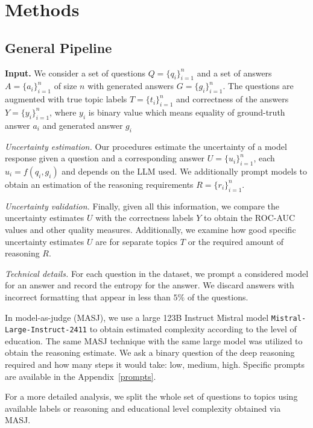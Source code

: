 \section{Methods}

\subsection{General Pipeline}

\textbf{Input.} We consider a set of questions $Q = \{q_i \}_{i = 1}^n$ and a set of answers $A = \{a_i \}_{i = 1}^n$ of size $n$ with generated answers $G = \{g_i \}_{i = 1}^n$.
The questions are augmented with true topic labels $T = \{t_i \}_{i = 1}^n$ and correctness of the answers $Y = \{y_i \}_{i = 1}^n$, where $y_i$ is binary value which means equality of ground-truth answer $a_i$ and generated answer $g_i$

\textit{Uncertainty estimation.} Our procedures estimate the uncertainty of a model response given a question and a corresponding answer $U = \{u_i \}_{i = 1}^n$, each $u_i = f(q_i, g_i)$ and depends on the LLM used.
We additionally prompt models to obtain an estimation of the reasoning requirements $R = \{r_i \}_{i = 1}^n$. 

\textit{Uncertainty validation.} Finally, given all this information, we compare the uncertainty estimates $U$ with the correctness labels $Y$ to obtain the ROC-AUC values and other quality measures. Additionally, we examine how good specific uncertainty estimates $U$ are for separate topics $T$ or the required amount of reasoning $R$.

\textit{Technical details.}
For each question in the dataset, we prompt a considered model for an answer and record the entropy for the answer. We discard answers with incorrect formatting that appear in less than $5\%$ of the questions.

In model-as-judge (MASJ), we use a large 123B Instruct Mistral model \texttt{Mistral-Large-Instruct-2411} to obtain estimated complexity according to the level of education.
The same MASJ technique with the same large model was utilized to obtain the reasoning estimate. We ask a binary question of the deep reasoning required and how many steps it would take: low, medium, high.
Specific prompts are available in the Appendix~\ref{prompts}.

For a more detailed analysis, we split the whole set of questions to topics using available labels or reasoning and educational level complexity obtained via MASJ.


